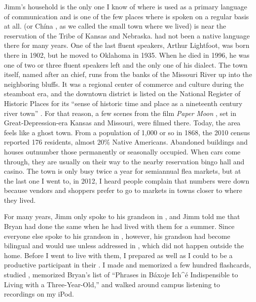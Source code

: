 \documentclass[output=paper]{LSP/langsci}
\begin{document}
Jimm's household is the only one I know of where  is used as a primary language of communication and is one of the few places where  is spoken on a regular basis at all.  (or Chína , as we called the small town where we lived) is near the reservation of the  Tribe of Kansas and Nebraska.  had not been a native language there for many years. One of the last fluent speakers, Arthur Lightfoot, was born there in 1902, but he moved to Oklahoma in 1935. When he died in 1996, he was one of two or three fluent speakers left and the only one of his dialect. The town itself, named after an  chief, runs from the banks of the Missouri River up into the neighboring bluffs. It was a regional center of commerce and culture during the steamboat era, and the downtown district is listed on the National Register of Historic Places for its ``sense of historic time and place as a nineteenth century river town'' \citep[1]{Wolfenbarger1996}. For that reason, a few scenes from the film \emph{Paper Moon} \citep{Bogdanovich1973}, set in Great-Depression-era Kansas and Missouri, were filmed there. Today, the area feels like a ghost town. From a population of 1,000 or so in 1868, the 2010 census reported 176 residents, almost 20\% Native Americans. Abandoned buildings and houses outnumber those permanently or seasonally occupied. When cars come through, they are usually on their way to the nearby reservation bingo hall and casino. The town is only busy twice a year for semiannual flea markets, but at the last one I went to, in 2012, I heard people complain that numbers were down because vendors and shoppers prefer to go to markets in towns closer to where they lived.

For many years, Jimm only spoke to his grandson in , and Jimm told me that Bryan had done the same when he had lived with them for a summer. Since everyone else spoke to his grandson in , however, his grandson had become bilingual and would use  unless addressed in , which did not happen outside the home. Before I went to live with them, I prepared as well as I could to be a productive participant in their . I made and memorized a few hundred flashcards, studied , memorized Bryan's list of ``Phrases in Báxoje Ich\^{ }é Indispensible to Living with a Three-Year-Old,'' and walked around campus listening to  recordings on my iPod.
\end{document}
